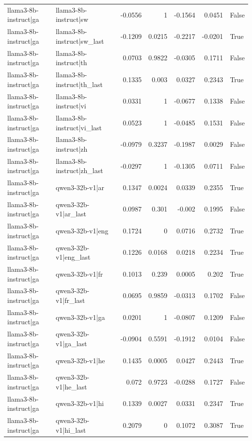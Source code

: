 \begin{table}
\begin{tabular}{l l r r r r l}
llama3-8b-instruct|ga & llama3-8b-instruct|sw & -0.0556 & 1 & -0.1564 & 0.0451 & False \\
llama3-8b-instruct|ga & llama3-8b-instruct|sw_last & -0.1209 & 0.0215 & -0.2217 & -0.0201 & True \\
llama3-8b-instruct|ga & llama3-8b-instruct|th & 0.0703 & 0.9822 & -0.0305 & 0.1711 & False \\
llama3-8b-instruct|ga & llama3-8b-instruct|th_last & 0.1335 & 0.003 & 0.0327 & 0.2343 & True \\
llama3-8b-instruct|ga & llama3-8b-instruct|vi & 0.0331 & 1 & -0.0677 & 0.1338 & False \\
llama3-8b-instruct|ga & llama3-8b-instruct|vi_last & 0.0523 & 1 & -0.0485 & 0.1531 & False \\
llama3-8b-instruct|ga & llama3-8b-instruct|zh & -0.0979 & 0.3237 & -0.1987 & 0.0029 & False \\
llama3-8b-instruct|ga & llama3-8b-instruct|zh_last & -0.0297 & 1 & -0.1305 & 0.0711 & False \\
llama3-8b-instruct|ga & qwen3-32b-v1|ar & 0.1347 & 0.0024 & 0.0339 & 0.2355 & True \\
llama3-8b-instruct|ga & qwen3-32b-v1|ar_last & 0.0987 & 0.301 & -0.002 & 0.1995 & False \\
llama3-8b-instruct|ga & qwen3-32b-v1|eng & 0.1724 & 0 & 0.0716 & 0.2732 & True \\
llama3-8b-instruct|ga & qwen3-32b-v1|eng_last & 0.1226 & 0.0168 & 0.0218 & 0.2234 & True \\
llama3-8b-instruct|ga & qwen3-32b-v1|fr & 0.1013 & 0.239 & 0.0005 & 0.202 & True \\
llama3-8b-instruct|ga & qwen3-32b-v1|fr_last & 0.0695 & 0.9859 & -0.0313 & 0.1702 & False \\
llama3-8b-instruct|ga & qwen3-32b-v1|ga & 0.0201 & 1 & -0.0807 & 0.1209 & False \\
llama3-8b-instruct|ga & qwen3-32b-v1|ga_last & -0.0904 & 0.5591 & -0.1912 & 0.0104 & False \\
llama3-8b-instruct|ga & qwen3-32b-v1|he & 0.1435 & 0.0005 & 0.0427 & 0.2443 & True \\
llama3-8b-instruct|ga & qwen3-32b-v1|he_last & 0.072 & 0.9723 & -0.0288 & 0.1727 & False \\
llama3-8b-instruct|ga & qwen3-32b-v1|hi & 0.1339 & 0.0027 & 0.0331 & 0.2347 & True \\
llama3-8b-instruct|ga & qwen3-32b-v1|hi_last & 0.2079 & 0 & 0.1072 & 0.3087 & True \\

\end{tabular}
\end{table}
